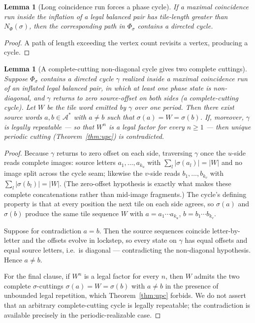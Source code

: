 \documentclass[11pt]{article}
\theoremstyle{plain}
\newtheorem{lemma}[theorem]{Lemma}
\theoremstyle{definition}
\theoremstyle{remark}
\newcommand{\A}{\mathcal{A}}
\begin{document}
\begin{lemma}[Long coincidence run forces a phase cycle]\label{lem:long-run-cycle}
If a maximal coincidence run inside the inflation of a legal balanced pair has tile-length greater than $N_\Phi(\sigma)$, then the corresponding path in $\Phi_\sigma$ contains a directed cycle.
\end{lemma}

\begin{proof}
A path of length exceeding the vertex count revisits a vertex, producing a cycle.
\end{proof}

\begin{lemma}[A complete-cutting non-diagonal cycle gives two complete cuttings]\label{lem:non-diag-cycle}
Suppose $\Phi_\sigma$ contains a directed cycle $\gamma$ realized inside a maximal coincidence run of an inflated legal balanced pair, in which at least one phase state is non-diagonal, \emph{and $\gamma$ returns to zero source-offset on both sides} (a complete-cutting cycle). Let $W$ be the tile word emitted by $\gamma$ over one period. Then there exist source words $a,b\in\A^*$ with $a\ne b$ such that $\sigma(a)=W=\sigma(b)$. If, moreover, $\gamma$ is legally repeatable --- so that $W^n$ is a legal factor for every $n\ge1$ --- then unique periodic cutting (Theorem~\ref{thm:upc}) is contradicted.
\end{lemma}

\begin{proof}
Because $\gamma$ returns to zero offset on each side, traversing $\gamma$ once the $u$-side reads complete images: source letters $a_1,\dots,a_{k_u}$ with $\sum_l|\sigma(a_l)|=|W|$ and no image split across the cycle seam; likewise the $v$-side reads $b_1,\dots,b_{k_v}$ with $\sum_l|\sigma(b_l)|=|W|$. (The zero-offset hypothesis is exactly what makes these complete concatenations rather than mid-image fragments.) The cycle's defining property is that at every position the next tile on each side agrees, so $\sigma(a)$ and $\sigma(b)$ produce the same tile sequence $W$ with $a=a_1\cdots a_{k_u}$, $b=b_1\cdots b_{k_v}$.

Suppose for contradiction $a=b$. Then the source sequences coincide letter-by-letter and the offsets evolve in lockstep, so every state on $\gamma$ has equal offsets and equal source letters, i.e.\ is diagonal --- contradicting the non-diagonal hypothesis. Hence $a\ne b$.

For the final clause, if $W^n$ is a legal factor for every $n$, then $W$ admits the two complete $\sigma$-cuttings $\sigma(a)=W=\sigma(b)$ with $a\ne b$ in the presence of unbounded legal repetition, which Theorem~\ref{thm:upc} forbids. We do not assert that an arbitrary complete-cutting cycle is legally repeatable; the contradiction is available precisely in the periodic-realizable case.
\end{proof}
\end{document}
